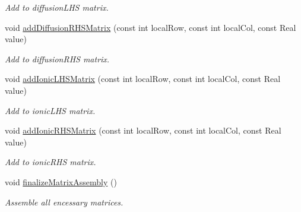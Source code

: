 \begin{DoxyCompactItemize}
\begin{DoxyCompactList}\small\item\em Add to diffusionLHS matrix. \item\end{DoxyCompactList}\item 
\hypertarget{structvoom_1_1_epetra_e_p_result_ab8ca77e8ea281df237573f98e52a9b7d}{
void \hyperlink{structvoom_1_1_epetra_e_p_result_ab8ca77e8ea281df237573f98e52a9b7d}{addDiffusionRHSMatrix} (const int localRow, const int localCol, const Real value)}
\label{structvoom_1_1_epetra_e_p_result_ab8ca77e8ea281df237573f98e52a9b7d}

\begin{DoxyCompactList}\small\item\em Add to diffusionRHS matrix. \item\end{DoxyCompactList}\item 
\hypertarget{structvoom_1_1_epetra_e_p_result_a93108c74a4883ceec63bd38716e52aa5}{
void \hyperlink{structvoom_1_1_epetra_e_p_result_a93108c74a4883ceec63bd38716e52aa5}{addIonicLHSMatrix} (const int localRow, const int localCol, const Real value)}
\label{structvoom_1_1_epetra_e_p_result_a93108c74a4883ceec63bd38716e52aa5}

\begin{DoxyCompactList}\small\item\em Add to ionicLHS matrix. \item\end{DoxyCompactList}\item 
\hypertarget{structvoom_1_1_epetra_e_p_result_aef126efc41851247b605838a99493ecd}{
void \hyperlink{structvoom_1_1_epetra_e_p_result_aef126efc41851247b605838a99493ecd}{addIonicRHSMatrix} (const int localRow, const int localCol, const Real value)}
\label{structvoom_1_1_epetra_e_p_result_aef126efc41851247b605838a99493ecd}

\begin{DoxyCompactList}\small\item\em Add to ionicRHS matrix. \item\end{DoxyCompactList}\item 
\hypertarget{structvoom_1_1_epetra_e_p_result_a5b0a114f755a2551d0b8d51ae56d14a1}{
void \hyperlink{structvoom_1_1_epetra_e_p_result_a5b0a114f755a2551d0b8d51ae56d14a1}{finalizeMatrixAssembly} ()}
\label{structvoom_1_1_epetra_e_p_result_a5b0a114f755a2551d0b8d51ae56d14a1}

\begin{DoxyCompactList}\small\item\em Assemble all encessary matrices. \item\end{DoxyCompactList}\end{DoxyCompactItemize}


